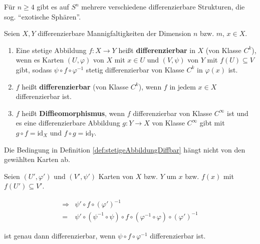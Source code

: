 \begin{bemerkung}
    Für $n \geq 4$ gibt es auf $S^n$ mehrere verschiedene differenzierbare
    Strukturen, die sog. \enquote{exotische Sphären}.
\end{bemerkung}

\begin{definition}
    Seien $X, Y$ differenzierbare Mannigfaltigkeiten der Dimension
    $n$ bzw. $m$, $x \in X$.

    \begin{enumerate}[label=\alph*),ref=\theplaindefinition.\alph*]
        \item Eine stetige Abbildung $f:X \rightarrow Y$ heißt\label{def:stetigeAbbildungDiffbar}
              \textbf{differenzierbar}
              in $X$ (von Klasse $C^k$),
              wenn es Karten $(U, \varphi)$ von $X$ mit
              $x \in U$ und $(V, \psi)$ von $Y$ mit $f(U) \subseteq V$
              gibt, sodass $\psi \circ f \circ \varphi^{-1}$ stetig
              differenzierbar von Klasse $C^k$ in $\varphi(x)$ ist.
        \item $f$ heißt \textbf{differenzierbar}
              (von Klasse $C^k$), wenn $f$ in jedem $x \in X$ 
              differenzierbar ist.
        \item $f$ heißt \textbf{Diffieomorphismus},
              wenn $f$ differenzierbar von Klasse $C^\infty$ ist und
              es eine differenzierbare Abbildung $g: Y \rightarrow X$
              von Klasse $C^\infty$ gibt mit $g \circ f = \text{id}_X$
              und $f \circ g = \text{id}_Y$.
    \end{enumerate}
\end{definition}

\begin{korollar}
    Die Bedingung in Definition \ref{def:stetigeAbbildungDiffbar} hängt nicht
    von den gewählten Karten ab.
\end{korollar}

\begin{beweis}
    Seien $(U', \varphi')$ und $(V', \psi')$ Karten von $X$ bzw. $Y$
    um $x$ bzw. $f(x)$ mit $f(U') \subseteq V'$.

    \begin{align*}
        \Rightarrow &\psi' \circ f \circ (\varphi')^{-1}\\
                  = &\psi' \circ ( \psi^{-1} \circ \psi) \circ f \circ (\varphi^{-1} \circ \varphi ) \circ (\varphi')^{-1}
    \end{align*}

    ist genau dann differenzierbar, wenn $\psi \circ f \circ \varphi^{-1}$
    differenzierbar ist.
\end{beweis}

